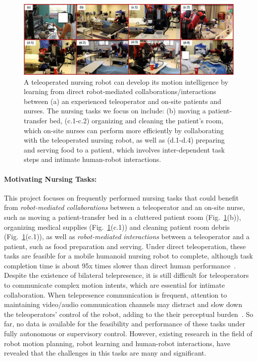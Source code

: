 \documentclass[letterpaper, 11 pt, onecolumn]{article}
\newcommand{\fig}[1]{Fig.~\ref{#1}}
\begin{document}
\begin{figure}[h!!]
\centering
\includegraphics[width=0.99\linewidth]{fig//DemoTasks}
\caption{ A teleoperated nursing robot can develop its motion intelligence by learning from direct robot-mediated collaborations/interactions between (a) an experienced teleoperator and on-site patients and nurses. The nursing tasks we focus on include: (b) moving a patient-transfer bed, (c.1-c.2) organizing and cleaning the patient's room, which on-site nurses can perform more efficiently by collaborating with the teleoperated nursing robot, as well as (d.1-d.4) preparing and serving food to a patient, which involves inter-dependent task steps and intimate human-robot interactions. }
\label{Tasks}
\end{figure}

\paragraph*{Motivating Nursing Tasks:} This project focuses on frequently performed nursing tasks that could benefit from \textit{robot-mediated collaborations} between a teleoperator and an on-site nurse, such as moving a patient-transfer bed in a cluttered patient room (\fig{Tasks}(b)), organizing medical supplies (\fig{Tasks}(c.1)) and cleaning patient room debris (\fig{Tasks}(c.1)), as well as  \textit{robot-mediated interactions} between a teleoperator and a patient, such as food preparation and serving. Under direct teleoperation, these tasks are feasible for a mobile humanoid nursing robot to complete, although task completion time is about 95x times slower than direct human performance~\cite{Hauser_Li_TRINA:17}. Despite the existence of bilateral telepresence, it is still difficult for teleoperators to communicate complex motion intents, which are essential for intimate collaboration. When telepresence communication is frequent, attention to maintaining video/audio communication channels may distract and slow down the teleoperators' control of the robot, adding to the their perceptual burden~\cite{Hauser_Li_BiTelepresence:17}. So far, no data is available for the feasibility and performance of these tasks under fully autonomous or supervisory control. However, existing research in the field of robot motion planning, robot learning and human-robot interactions, have revealed that the challenges in this tasks are many and significant. 
\end{document}
